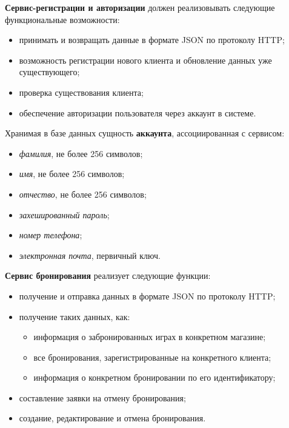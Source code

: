 \textbf{Сервис-регистрации и авторизации} должен реализовывать следующие функциональные возможности:
\begin{itemize}
	\item принимать и возвращать данные в формате JSON по протоколу HTTP;
	
	\item возможность регистрации нового клиента и обновление данных уже существующего;
	
	\item проверка существования клиента;
	
	\item обеспечение авторизации пользователя через аккаунт в системе.
\end{itemize}
%
Хранимая в базе данных сущность \textbf{аккаунта}, ассоциированная с сервисом:
\begin{itemize}[label=---]
\item \textit{фамилия}, не более 256 символов;
\item \textit{имя}, не более 256 символов;
\item \textit{отчество}, не более 256 символов;
\item \textit{захешированный пароль};
\item \textit{номер телефона};
\item \textit{электронная почта}, первичный ключ.
\end{itemize}
\textbf{Сервис бронирования} реализует следующие функции:
\begin{itemize}
	\item получение и отправка данных в формате JSON по протоколу HTTP;
	
	\item получение таких данных, как:
	
	\begin{itemize}		
		\item информация о забронированных играх в конкретном магазине;
		
		\item все бронирования, зарегистрированные на конкретного клиента;
		
		\item информация о конкретном бронировании по его идентификатору;
	\end{itemize}
	
	\item составление заявки на отмену бронирования;

	\item создание, редактирование и отмена бронирования.
\end{itemize}
